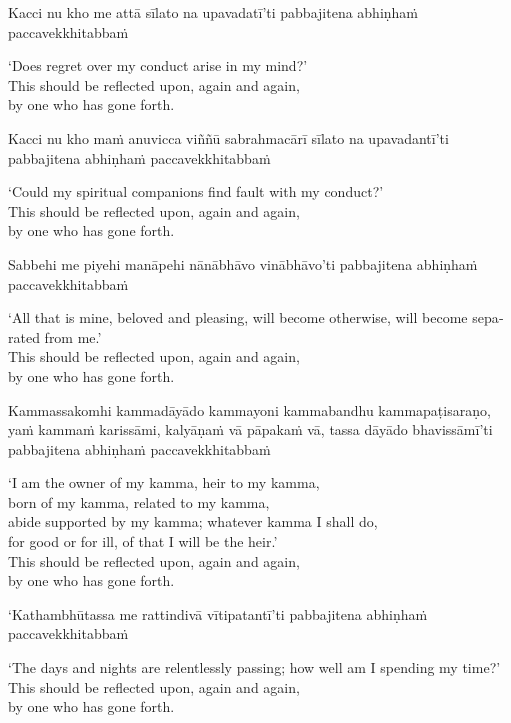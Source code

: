 Kacci nu kho me attā sīlato na upavadatī'ti pabbajitena abhiṇhaṁ paccavekkhitabbaṁ

\begin{english}
  `Does regret over my conduct arise in my mind?'\\
  This should be reflected upon, again and again,\\
  by one who has gone forth.
\end{english}

Kacci nu kho maṁ anuvicca viññū sabrahmacārī sīlato na upavadantī'ti pabbajitena abhiṇhaṁ paccavekkhitabbaṁ

\begin{english}
  `Could my spiritual companions find fault with my conduct?'\\
  This should be reflected upon, again and again,\\
  by one who has gone forth.
\end{english}

Sabbehi me piyehi manāpehi nānābhāvo vinābhāvo'ti pabbajitena abhiṇhaṁ paccavekkhitabbaṁ

\begin{english}
  `All that is mine, beloved and pleasing, will become otherwise, will become separated from me.'\\
  This should be reflected upon, again and again,\\
  by one who has gone forth.
\end{english}

Kammassakomhi kammadāyādo kammayoni kammabandhu kammapaṭisaraṇo, yaṁ kammaṁ karissāmi, kalyāṇaṁ vā pāpakaṁ vā, tassa dāyādo bhavissāmī'ti pabbajitena abhiṇhaṁ paccavekkhitabbaṁ

\begin{english}
  `I am the owner of my kamma, heir to my kamma,\\
  born of my kamma, related to my kamma,\\
  abide supported by my kamma; whatever kamma I shall do,\\
  for good or for ill, of that I will be the heir.'\\
  This should be reflected upon, again and again,\\
  by one who has gone forth.
\end{english}

`Kathambhūtassa me rattindivā vītipatantī'ti pabbajitena abhiṇhaṁ paccavekkhitabbaṁ

\begin{english}
  `The days and nights are relentlessly passing; how well am I spending my time?'\\
  This should be reflected upon, again and again,\\
  by one who has gone forth.
\end{english}

